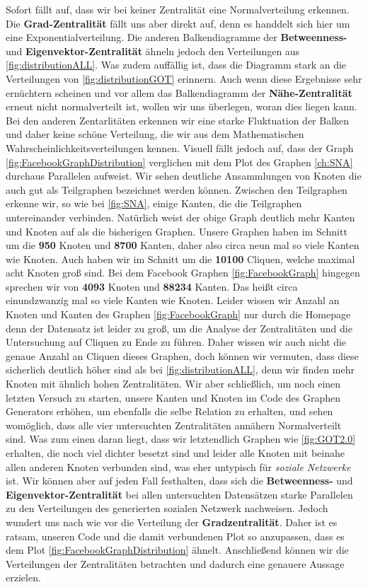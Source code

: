 Sofort fällt auf, dass wir bei keiner Zentralität eine Normalverteilung erkennen. Die \textbf{Grad-Zentralität} fällt uns aber direkt auf, denn es handdelt sich hier um eine Exponentialverteilung. Die anderen Balkendiagramme der \textbf{Betweenness-} und \textbf{Eigenvektor-Zentralität} ähneln jedoch den Verteilungen aus \ref{fig:distributionALL}. Was zudem auffällig ist, dass die Diagramm stark an die Verteilungen von \ref{fig:distributionGOT} erinnern. Auch wenn diese Ergebnisse sehr ernüchtern scheinen und vor allem das Balkendiagramm der \textbf{Nähe-Zentralität} erneut nicht normalverteilt ist, wollen wir uns überlegen, woran dies liegen kann. Bei den anderen Zentarlitäten erkennen wir eine starke Fluktuation der Balken und daher keine schöne Verteilung, die wir aus dem Mathematischen Wahrscheinlichkeitsverteilungen kennen. Visuell fällt jedoch auf, dass der Graph \ref{fig:FacebookGraphDistribution} verglichen mit dem Plot des Graphen \ref{ch:SNA} durchaus Parallelen aufweist. Wir sehen deutliche Ansammlungen von Knoten die auch gut als Teilgraphen bezeichnet werden können. Zwischen den Teilgraphen erkenne wir, so wie bei \ref{fig:SNA}, einige Kanten, die die Teilgraphen untereinander verbinden. Natürlich weist der obige Graph deutlich mehr Kanten und Knoten auf als die bisherigen Graphen. Unsere Graphen haben im Schnitt um die \textbf{950} Knoten und \textbf{8700} Kanten, daher also circa neun mal so viele Kanten wie Knoten. Auch haben wir im Schnitt um die \textbf{10100} Cliquen, welche maximal acht Knoten groß sind. Bei dem Facebook Graphen \ref{fig:FacebookGraph} hingegen sprechen wir von \textbf{4093} Knoten und \textbf{88234} Kanten. Das heißt circa einundzwanzig mal so viele Kanten wie Knoten. Leider wissen wir Anzahl an Knoten und Kanten des Graphen \ref{fig:FacebookGraph} nur durch die Homepage \cite{FBData} denn der Datensatz ist leider zu groß, um die Analyse der Zentralitäten und die Untersuchung auf Cliquen zu Ende zu führen. Daher wissen wir auch nicht die genaue Anzahl an Cliquen dieses Graphen, doch können wir vermuten, dass diese sicherlich deutlich höher sind als bei \ref{fig:distributionALL}, denn wir finden mehr Knoten mit ähnlich hohen Zentralitäten. Wir aber schließlich, um noch einen letzten Versuch zu starten, unsere Kanten und Knoten im Code des Graphen Generators erhöhen, um ebenfalls die selbe Relation zu erhalten, und sehen womöglich, dass alle vier untersuchten Zentralitäten annähern Normalverteilt sind. Was zum einen daran liegt, dass wir letztendlich Graphen wie \ref{fig:GOT2.0} erhalten, die noch viel dichter besetzt sind und leider alle Knoten mit beinahe allen anderen Knoten verbunden sind, was eher untypisch für \textit{soziale Netzwerke} ist. Wir können aber auf jeden Fall festhalten, dass sich die \textbf{Betweenness-} und \textbf{Eigenvektor-Zentralität} bei allen untersuchten Datensätzen starke Parallelen zu den Verteilungen des generierten sozialen Netzwerk nachweisen. Jedoch wundert uns nach wie vor die Verteilung der \textbf{Gradzentralität}. Daher ist es ratsam, unseren Code und die damit verbundenen Plot so anzupassen, dass es dem Plot \ref{fig:FacebookGraphDistribution} ähnelt. Anschließend können wir die Verteilungen der Zentralitäten betrachten und dadurch eine genauere Aussage erzielen. 


